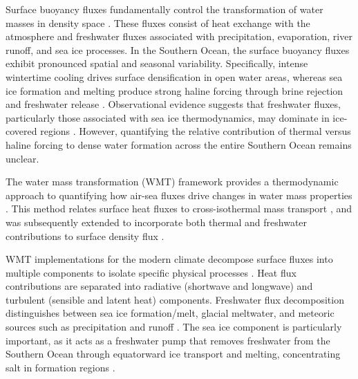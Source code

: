 \documentclass[pdflatex,sn-nature]{sn-jnl}
\begin{document}
Surface buoyancy fluxes fundamentally control the transformation of water masses in density space \cite{Walin1982,Speer1992,drake2025water}. These fluxes consist of heat exchange with the atmosphere and freshwater fluxes associated with precipitation, evaporation, river runoff, and sea ice processes. In the Southern Ocean, the surface buoyancy fluxes exhibit pronounced spatial and seasonal variability. Specifically, intense wintertime cooling drives surface densification in open water areas, whereas sea ice formation and melting produce strong haline forcing through brine rejection and freshwater release \cite{Abernathey2016,Pellichero2018}. Observational evidence suggests that freshwater fluxes, particularly those associated with sea ice thermodynamics, may dominate in ice-covered regions \cite{Pellichero2018,Bailey2023}. However, quantifying the relative contribution of thermal versus haline forcing to dense water formation across the entire Southern Ocean remains unclear.




The water mass transformation (WMT) framework provides a thermodynamic approach to quantifying how air-sea fluxes drive changes in water mass properties \cite{Walin1982,Groeskamp2019,drake2025water}. This method relates surface heat fluxes to cross-isothermal mass transport \cite{Walin1982}, and was subsequently extended  to incorporate both thermal and freshwater contributions to surface density flux \cite{Speer1992}.

WMT implementations for the modern climate decompose surface fluxes into multiple components to isolate specific physical processes \cite{Iudicone2008a,Iudicone2008b}. Heat flux contributions are separated into radiative (shortwave and longwave) and turbulent (sensible and latent heat) components. Freshwater flux decomposition distinguishes between sea ice formation/melt, glacial meltwater, and meteoric sources such as precipitation and runoff \cite{Abernathey2016,Bailey2023}. The sea ice component is particularly important, as it acts as a freshwater pump that removes freshwater from the Southern Ocean through equatorward ice transport and melting, concentrating salt in formation regions \cite{Abernathey2016}.
\end{document}
